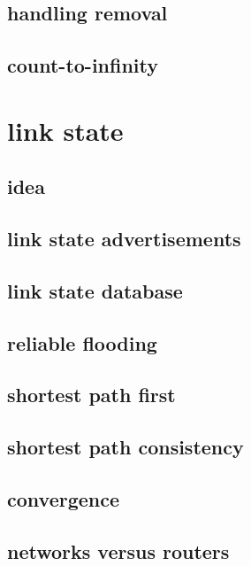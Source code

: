 \subsection{handling removal}

\subsection{count-to-infinity}

\section{link state}
\subsection{idea}

\subsection{link state advertisements}

\subsection{link state database}

\subsection{reliable flooding}


\subsection{shortest path first}



\subsection{shortest path consistency}


\subsection{convergence}


\subsection{networks versus routers}
 

